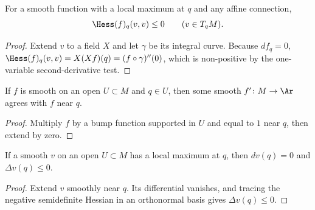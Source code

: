 \begin{lemma}
\label{lem:hessian-nonpositive-at-max}



For a smooth function with a local maximum at $q$ and any affine
connection,
$$\Hess(f)_q(v,v)\le0\qquad(v\in T_qM).$$
\end{lemma}
\begin{proof}
\sketch
\leanok
{}
Extend $v$ to a field $X$ and let $\gamma$ be its integral curve.
Because $df_q=0$,
$\Hess(f)_q(v,v)=X(Xf)(q)=(f\circ\gamma)''(0)$, which is non-positive
by the one-variable second-derivative test.
\end{proof}

\begin{lemma}
\label{lem:smooth-local-extension}


If $f$ is smooth on an open $U\subset M$ and $q\in U$, then some smooth
$f'\colon M\to\Ar$ agrees with $f$ near $q$.
\end{lemma}
\begin{proof}
\sketch
\leanok
Multiply $f$ by a bump function supported in $U$ and equal to $1$ near
$q$, then extend by zero.
\end{proof}

\begin{lemma}
\label{lem:laplacian-nonpositive-at-max}
\leanok



If a smooth $v$ on an open $U\subset M$ has a local maximum at $q$, then
$dv(q)=0$ and $\Delta v(q)\le0$.
\end{lemma}
\begin{proof}
\sketch
\leanok
{}
Extend $v$ smoothly near $q$. Its differential vanishes, and tracing the
negative semidefinite Hessian in an orthonormal basis gives
$\Delta v(q)\le0$.
\end{proof}

